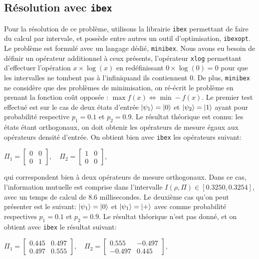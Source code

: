 \documentclass[12pt,a4paper]{article}
\begin{document}
    \subsection*{Résolution avec \texttt{ibex}}

    Pour la résolution de ce problème, utilisons la librairie \texttt{ibex} permettant de faire du calcul par intervale, et possède entre autres un outil d'optimisation, \texttt{ibexopt}. Le problème est formulé avec un langage dédié, \texttt{minibex}. Nous avons eu besoin de définir un opérateur additionnel à ceux présents, l'opérateur \texttt{xlog} permettant d'effectuer l'opération $x \times \log(x)$ en redéfinissant $0 \times \log(0) = 0$ pour que les intervalles ne tombent pas à l'infiniquand ils contiennent 0. De plus, \texttt{minibex} ne considère que des problèmes de minimisation, on ré-écrit le problème en prenant la fonction coût opposée : $\max f(x) \Leftrightarrow \min -f(x)$.
    \medbreak
    Le premier test effectué est sur le cas de deux états d'entrée $\ket{\psi_1} = \ket{0}$ et $\ket{\psi_2} = \ket{1}$ ayant pour probabilité respective $p_1 = 0.1$ et $p_2 = 0.9$. Le résultat théorique est connu: les états étant orthogonaux, on doit obtenir les opérateurs de mesure égaux aux opérateurs densité d'entrée. On obtient bien avec \texttt{ibex} les opérateurs suivant:

    $\Pi_1 = \begin{bmatrix} 0 & 0 \\ 0 & 1\end{bmatrix} , \quad \Pi_2 = \begin{bmatrix} 1 & 0 \\ 0 & 0\end{bmatrix},$

    qui correspondent bien à deux opérateurs de mesure orthogonaux. Dans ce cas, l'information mutuelle est comprise dans l'intervalle $I(\rho, \Pi) \in [0.3250, 0.3254]$, avec un temps de calcul de 8.6 millisecondes.
\medbreak
    Le deuxième cas qu'on peut présenter est le suivant: $\ket{\psi_1} = \ket{0}$ et $\ket{\psi_1} = \ket{+}$ avec comme probabilité respectives $p_1 = 0.1$ et $p_2 = 0.9$. Le résultat théorique n'est pas donné, et on obtient avec \texttt{ibex} le résultat suivant:

    $\Pi_1 = \begin{bmatrix} 0.445 & 0.497 \\ 0.497 & 0.555\end{bmatrix} , \quad \Pi_2 = \begin{bmatrix} 0.555 & -0.497 \\ -0.497 & 0.445\end{bmatrix},$
\end{document}

